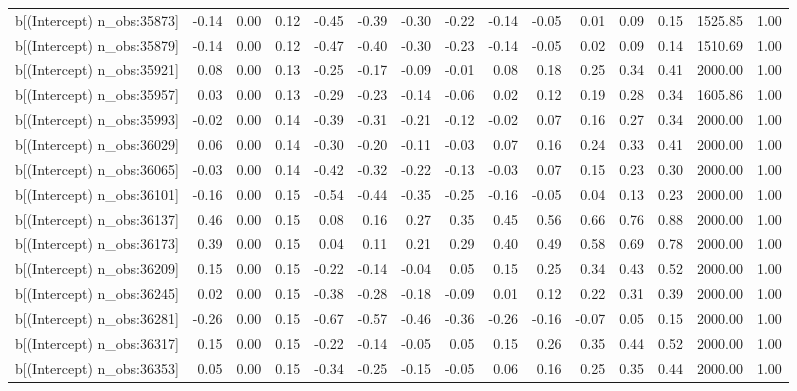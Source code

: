 \begin{table}[ht]
\begin{tabular}{rrrrrrrrrrrrrrr}
  b[(Intercept) n\_obs:35873] & -0.14 & 0.00 & 0.12 & -0.45 & -0.39 & -0.30 & -0.22 & -0.14 & -0.05 & 0.01 & 0.09 & 0.15 & 1525.85 & 1.00 \\ 
  b[(Intercept) n\_obs:35879] & -0.14 & 0.00 & 0.12 & -0.47 & -0.40 & -0.30 & -0.23 & -0.14 & -0.05 & 0.02 & 0.09 & 0.14 & 1510.69 & 1.00 \\ 
  b[(Intercept) n\_obs:35921] & 0.08 & 0.00 & 0.13 & -0.25 & -0.17 & -0.09 & -0.01 & 0.08 & 0.18 & 0.25 & 0.34 & 0.41 & 2000.00 & 1.00 \\ 
  b[(Intercept) n\_obs:35957] & 0.03 & 0.00 & 0.13 & -0.29 & -0.23 & -0.14 & -0.06 & 0.02 & 0.12 & 0.19 & 0.28 & 0.34 & 1605.86 & 1.00 \\ 
  b[(Intercept) n\_obs:35993] & -0.02 & 0.00 & 0.14 & -0.39 & -0.31 & -0.21 & -0.12 & -0.02 & 0.07 & 0.16 & 0.27 & 0.34 & 2000.00 & 1.00 \\ 
  b[(Intercept) n\_obs:36029] & 0.06 & 0.00 & 0.14 & -0.30 & -0.20 & -0.11 & -0.03 & 0.07 & 0.16 & 0.24 & 0.33 & 0.41 & 2000.00 & 1.00 \\ 
  b[(Intercept) n\_obs:36065] & -0.03 & 0.00 & 0.14 & -0.42 & -0.32 & -0.22 & -0.13 & -0.03 & 0.07 & 0.15 & 0.23 & 0.30 & 2000.00 & 1.00 \\ 
  b[(Intercept) n\_obs:36101] & -0.16 & 0.00 & 0.15 & -0.54 & -0.44 & -0.35 & -0.25 & -0.16 & -0.05 & 0.04 & 0.13 & 0.23 & 2000.00 & 1.00 \\ 
  b[(Intercept) n\_obs:36137] & 0.46 & 0.00 & 0.15 & 0.08 & 0.16 & 0.27 & 0.35 & 0.45 & 0.56 & 0.66 & 0.76 & 0.88 & 2000.00 & 1.00 \\ 
  b[(Intercept) n\_obs:36173] & 0.39 & 0.00 & 0.15 & 0.04 & 0.11 & 0.21 & 0.29 & 0.40 & 0.49 & 0.58 & 0.69 & 0.78 & 2000.00 & 1.00 \\ 
  b[(Intercept) n\_obs:36209] & 0.15 & 0.00 & 0.15 & -0.22 & -0.14 & -0.04 & 0.05 & 0.15 & 0.25 & 0.34 & 0.43 & 0.52 & 2000.00 & 1.00 \\ 
  b[(Intercept) n\_obs:36245] & 0.02 & 0.00 & 0.15 & -0.38 & -0.28 & -0.18 & -0.09 & 0.01 & 0.12 & 0.22 & 0.31 & 0.39 & 2000.00 & 1.00 \\ 
  b[(Intercept) n\_obs:36281] & -0.26 & 0.00 & 0.15 & -0.67 & -0.57 & -0.46 & -0.36 & -0.26 & -0.16 & -0.07 & 0.05 & 0.15 & 2000.00 & 1.00 \\ 
  b[(Intercept) n\_obs:36317] & 0.15 & 0.00 & 0.15 & -0.22 & -0.14 & -0.05 & 0.05 & 0.15 & 0.26 & 0.35 & 0.44 & 0.52 & 2000.00 & 1.00 \\ 
  b[(Intercept) n\_obs:36353] & 0.05 & 0.00 & 0.15 & -0.34 & -0.25 & -0.15 & -0.05 & 0.06 & 0.16 & 0.25 & 0.35 & 0.44 & 2000.00 & 1.00 \\ 

\end{tabular}
\end{table}
